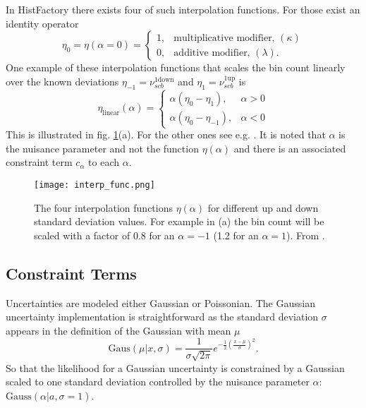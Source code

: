 In HistFactory there exists four of such interpolation functions. For those exist an identity operator
\begin{equation}
    \eta_0=\eta (\alpha=0) =
    \begin{cases}
        1 , & \text{multiplicative modifier, } (\kappa) \\
        0 , & \text{additive modifier, } (\lambda).
    \end{cases}
\end{equation}
One example of these interpolation functions that scales the bin count linearly over the known deviations $\eta_{-1}=\nu_{scb}^\mathrm{1down}$ and $\eta_{1}=\nu_{scb}^\mathrm{1up}$ is
\begin{equation}
    \eta_\mathrm{linear}(\alpha)=
    \begin{cases}
        \alpha(\eta_0 - \eta_1) ,    & \alpha>0 \\
        \alpha(\eta_0 - \eta_{-1}) , & \alpha<0
    \end{cases}
\end{equation}
This is illustrated in fig. \ref{fig:interp_func}(a). For the other ones see e.g. \citep{heinrich2019searches}. It is noted that $\alpha$ is the nuisance parameter and not the function $\eta(\alpha)$ and there is an associated constraint term $c_\alpha$ to each $\alpha$.
\begin{figure}
    \centering
    \texttt{[image: interp\_func.png]}
    \caption[]{The four interpolation functions $\eta(\alpha)$ for different up and down standard deviation values. For example in (a) the bin count will be scaled with a factor of 0.8 for an $\alpha=-1$ (1.2 for an $\alpha=1$). From \citep{cranmer2012histfactory}.}
    \label{fig:interp_func}
\end{figure}

\subsection{Constraint Terms}\label{sec:constraint_terms}
Uncertainties are modeled either Gaussian or Poissonian. The Gaussian uncertainty implementation is straightforward as the standard deviation $\sigma$ appears in the definition of the Gaussian with mean $\mu$
\begin{equation}
    \text{Gaus}(\mu|x,\sigma)=\frac{1}{\sigma\sqrt{2\pi}}e^{-\frac{1}{2}\left(\frac{x-\mu}{\sigma}\right)^2}.
\end{equation}
So that the likelihood for a Gaussian uncertainty is constrained by a Gaussian scaled to one standard deviation controlled by the nuisance parameter $\alpha$: \mbox{$\mathrm{Gauss}(\alpha | a, \sigma=1)$}.

